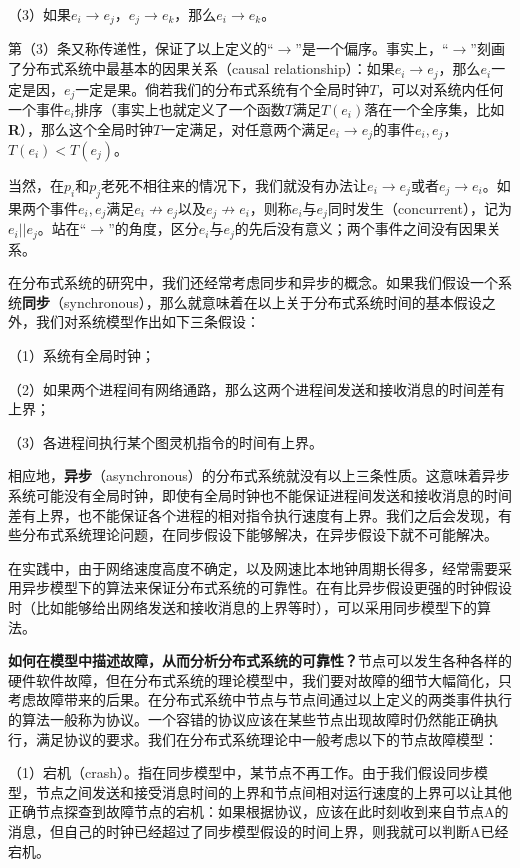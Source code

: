 \documentclass[UTF8,AutoFakeBold=1,AutoFakeSlant,zihao=-4]{cucthesis}
\begin{document}
（3）如果$e_i \rightarrow e_j$，$e_j \rightarrow e_k$，那么$e_i \rightarrow e_k$。

第（3）条又称传递性，保证了以上定义的“$\rightarrow$”是一个偏序。事实上，“$\rightarrow$”刻画了分布式系统中最基本的因果关系（causal relationship）：如果$e_i \rightarrow e_j$，那么$e_i$一定是因，$e_j$一定是果。倘若我们的分布式系统有个全局时钟$T$，可以对系统内任何一个事件$e_i$排序（事实上也就定义了一个函数$T$满足$T(e_i) $落在一个全序集，比如\textbf R），那么这个全局时钟$T$一定满足，对任意两个满足$e_i \to e_j$的事件$e_i,e_j$，$T(e_i) < T(e_j)$。

当然，在$p_i$和$p_j$老死不相往来的情况下，我们就没有办法让$e_i \rightarrow e_j$或者$e_j \rightarrow e_i$。如果两个事件$e_i, e_j$满足$e_i \not\rightarrow e_j$以及$e_j \not\rightarrow e_i$，则称$e_i$与$e_j$同时发生（concurrent），记为$e_i || e_j$。站在“$\rightarrow$”的角度，区分$e_i$与$e_j$的先后没有意义；两个事件之间没有因果关系。

在分布式系统的研究中，我们还经常考虑同步和异步的概念。如果我们假设一个系统\textbf{同步}（synchronous），那么就意味着在以上关于分布式系统时间的基本假设之外，我们对系统模型作出如下三条假设：

（1）系统有全局时钟；

（2）如果两个进程间有网络通路，那么这两个进程间发送和接收消息的时间差有上界；

（3）各进程间执行某个图灵机指令的时间有上界。

相应地，\textbf{异步}（asynchronous）的分布式系统就没有以上三条性质。这意味着异步系统可能没有全局时钟，即使有全局时钟也不能保证进程间发送和接收消息的时间差有上界，也不能保证各个进程的相对指令执行速度有上界。我们之后会发现，有些分布式系统理论问题，在同步假设下能够解决，在异步假设下就不可能解决。

在实践中，由于网络速度高度不确定，以及网速比本地钟周期长得多，经常需要采用异步模型下的算法来保证分布式系统的可靠性。在有比异步假设更强的时钟假设时（比如能够给出网络发送和接收消息的上界等时），可以采用同步模型下的算法。

\textbf{如何在模型中描述故障，从而分析分布式系统的可靠性？}节点可以发生各种各样的硬件软件故障，但在分布式系统的理论模型中，我们要对故障的细节大幅简化，只考虑故障带来的后果。在分布式系统中节点与节点间通过以上定义的两类事件执行的算法一般称为协议。一个容错的协议应该在某些节点出现故障时仍然能正确执行，满足协议的要求。我们在分布式系统理论中一般考虑以下的节点故障模型：

（1）宕机（crash）。指在同步模型中，某节点不再工作。由于我们假设同步模型，节点之间发送和接受消息时间的上界和节点间相对运行速度的上界可以让其他正确节点探查到故障节点的宕机：如果根据协议，应该在此时刻收到来自节点A的消息，但自己的时钟已经超过了同步模型假设的时间上界，则我就可以判断A已经宕机。
\end{document}
